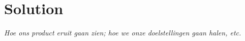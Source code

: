 \section{Solution}
\emph{Hoe ons product eruit gaan zien; hoe we onze doelstellingen gaan halen, etc.}
